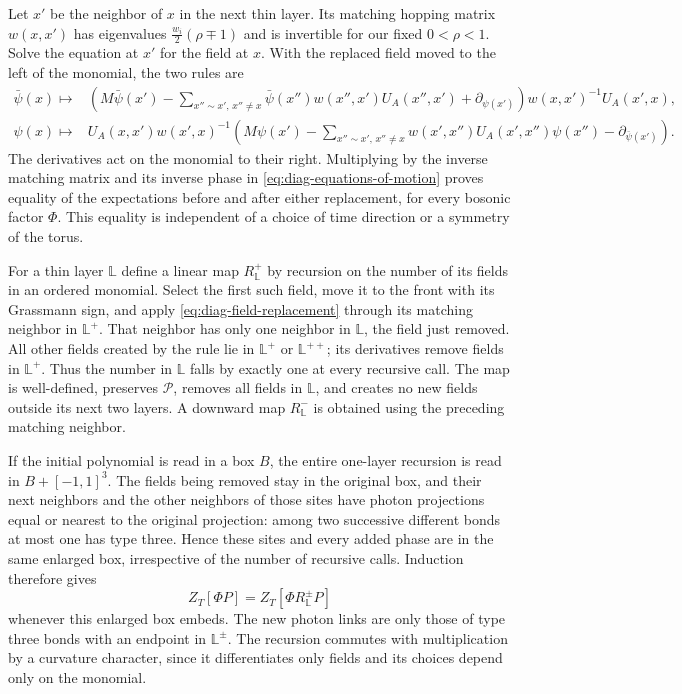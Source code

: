 \documentclass[11pt,letterpaper,reqno]{amsart}
\begin{document}
Let $x'$ be the neighbor of $x$ in the next thin layer. Its
matching hopping matrix $w(x,x')$ has eigenvalues
$\frac{w_i}{2}(\rho\mp1)$ and is invertible for our fixed
$0<\rho<1$. Solve the equation at $x'$ for the field at $x$.
With the replaced field moved to the left of the monomial,
the two rules are
\begin{equation}\label{eq:diag-field-replacement}
 \begin{split}
 \bar\psi(x)\longmapsto{}&
 \left(M\bar\psi(x')-
   \sum_{x''\sim x',\,x''\ne x}\bar\psi(x'')w(x'',x')U_A(x'',x')
                  +\partial_{\psi(x')}\right)
                     w(x,x')^{-1}U_A(x',x),\\
 \psi(x)\longmapsto{}&U_A(x,x')w(x',x)^{-1}
 \left(M\psi(x')-
   \sum_{x''\sim x',\,x''\ne x}w(x',x'')U_A(x',x'')\psi(x'')
                  -\partial_{\bar\psi(x')}\right).
 \end{split}
\end{equation}
The derivatives act on the monomial to their right. Multiplying
by the inverse matching matrix and its inverse phase in
\eqref{eq:diag-equations-of-motion} proves equality of the
expectations before and after either replacement, for every
bosonic factor $\Phi$. This equality is independent of a choice
of time direction or a symmetry of the torus.

For a thin layer $\mathbb L$ define a linear map $R^+_{\mathbb L}$
by recursion on the number of its fields in an ordered monomial.
Select the first such field, move it to the front with its
Grassmann sign, and apply \eqref{eq:diag-field-replacement}
through its matching neighbor in $\mathbb L^+$. That neighbor
has only one neighbor in $\mathbb L$, the field just removed.
All other fields created by the rule lie in $\mathbb L^+$ or
$\mathbb L^{++}$; its derivatives remove fields in
$\mathbb L^+$. Thus the number in $\mathbb L$ falls by exactly
one at every recursive call. The map is well-defined, preserves
$\mathcal P$, removes all fields in $\mathbb L$, and creates
no new fields outside its next two layers. A downward map
$R^-_{\mathbb L}$ is obtained using the preceding matching
neighbor.

If the initial polynomial is read in a box $B$, the entire
one-layer recursion is read in $B+[-1,1]^3$. The fields being
removed stay in the original box, and their next neighbors
and the other neighbors of those sites have photon projections
equal or nearest to the original projection: among two successive
different bonds at most one has type three. Hence these sites
and every added phase are in the same enlarged box, irrespective
of the number of recursive calls. Induction therefore gives
\begin{equation}\label{eq:diag-thin-layer-identity}
 Z_T[\Phi P]=Z_T[\Phi R^\pm_{\mathbb L}P]
\end{equation}
whenever this enlarged box embeds. The new photon links are
only those of type three bonds with an endpoint in
$\mathbb L^\pm$. The recursion commutes with multiplication
by a curvature character, since it differentiates only fields
and its choices depend only on the monomial.
\end{document}
